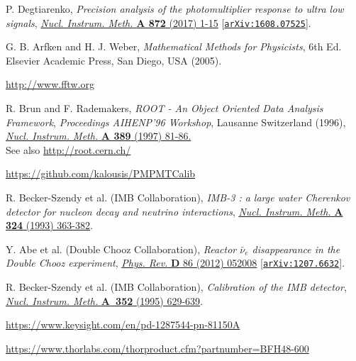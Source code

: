 \documentclass[a4paper,11pt]{article}
\begin{document}
\begin{thebibliography}{99}
 P. Degtiarenko, \emph{Precision analysis of the photomultiplier response to ultra low signals}, 
\href{https://www.sciencedirect.com/science/article/pii/S0168900217308252?via\%3Dihub}{\emph{Nucl. Instrum. Meth.} {\bf A 872} (2017) 1-15} 
[\href{https://arxiv.org/abs/1608.07525}{\texttt{arXiv:1608.07525}}]. 



 G. B. Arfken and H. J. Weber, \emph{Mathematical Methods for Physicists}, 6th Ed. Elsevier Academic Press, San Diego, USA (2005).

 \href{http://www.fftw.org}{http://www.fftw.org} 

 R. Brun and F. Rademakers, \emph{ROOT - An Object Oriented Data Analysis Framework}, \emph{Proceedings AIHENP'96 Workshop}, Lausanne Switzerland (1996),
\href{https://www.sciencedirect.com/science/article/pii/S016890029700048X?via\%3Dihub}{\emph{Nucl. Instrum. Meth.} {\bf A 389 } (1997) 81-86.} \\
See also \href{http://root.cern.ch/}{http://root.cern.ch/}

 \href{https://github.com/kalousis/PMTCalib}{https://github.com/kalousis/PMPMTCalib}

 R. Becker-Szendy {et al.} (IMB Collaboration), \emph{IMB-3 : a large water Cherenkov detector for nucleon decay and neutrino interactions}, 
\href{https://www.sciencedirect.com/science/article/pii/016890029390998W?via\%3Dihub}{\emph{Nucl. Instrum. Meth.} {\bf A 324} (1993) 363-382}.

 Y. Abe  {et al.} (Double Chooz Collaboration), \emph{Reactor $\bar\nu_e$ disappearance in the Double Chooz experiment}, 
\href{https://doi.org/10.1103/PhysRevLett.108.131801}{\emph{Phys. Rev.} {\bf D}  86 (2012) 052008}    [\href{https://arxiv.org/abs/1207.6632}{\texttt{arXiv:1207.6632}}]. 

 R. Becker-Szendy {et al.} (IMB Collaboration), \emph{Calibration of the IMB detector}, 
\href{https://www.sciencedirect.com/science/article/pii/0168900295900187?via\%3Dihub}{\emph{Nucl. Instrum. Meth.} {\bf A~352} (1995) 629-639}.

 \href{https://www.keysight.com/en/pd-1287544-pn-81150A/pulse-function-arbitrary-noise-generator?nid=-536902255.748669.00&cc=FR&lc=fre}{https://www.keysight.com/en/pd-1287544-pn-81150A}

 \href{https://www.thorlabs.com/thorproduct.cfm?partnumber=BFH48-600}{https://www.thorlabs.com/thorproduct.cfm?partnumber=BFH48-600}


\end{thebibliography}
\end{document}

